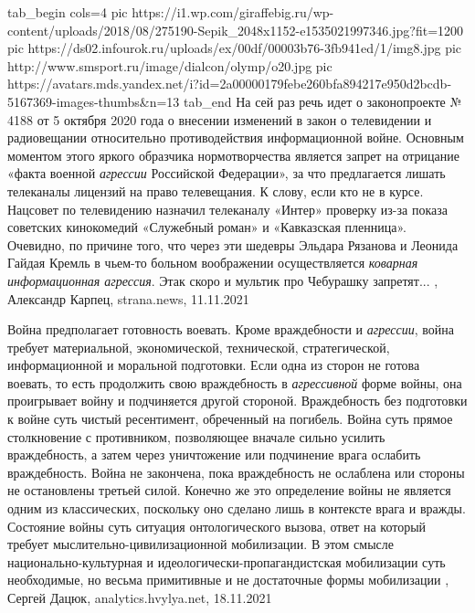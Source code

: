 \ifcmt
  tab_begin cols=4
		 pic https://i1.wp.com/giraffebig.ru/wp-content/uploads/2018/08/275190-Sepik_2048x1152-e1535021997346.jpg?fit=1200%
		 pic https://ds02.infourok.ru/uploads/ex/00df/00003b76-3fb941ed/1/img8.jpg
     pic http://www.smsport.ru/image/dialcon/olymp/o20.jpg
     pic https://avatars.mds.yandex.net/i?id=2a00000179febe260bfa894217e950d2bcdb-5167369-images-thumbs&n=13
  tab_end
\fi
На сей раз речь идет о законопроекте № 4188 от 5 октября 2020 года о внесении
изменений в закон о телевидении и радиовещании относительно противодействия
информационной войне. Основным моментом этого яркого образчика нормотворчества
является запрет на отрицание «факта военной \emph{агрессии} Российской
Федерации», за что предлагается лишать телеканалы лицензий на право
телевещания.  К слову, если кто не в курсе. Нацсовет по телевидению назначил
телеканалу «Интер» проверку из-за показа советских кинокомедий «Служебный
роман» и «Кавказская пленница». Очевидно, по причине того, что через эти
шедевры Эльдара Рязанова и Леонида Гайдая Кремль в чьем-то больном воображении
осуществляется \emph{коварная информационная агрессия}. Этак скоро и мультик
про Чебурашку запретят...
, 
Александр Карпец, strana.news, 11.11.2021

Война предполагает готовность воевать. Кроме враждебности и \emph{агрессии},
война требует материальной, экономической, технической, стратегической,
информационной и моральной подготовки. Если одна из сторон не готова воевать,
то есть продолжить свою враждебность в \emph{агрессивной} форме войны, она проигрывает
войну и подчиняется другой стороной.  Враждебность без подготовки к войне суть
чистый ресентимент, обреченный на погибель.  Война суть прямое столкновение с
противником, позволяющее вначале сильно усилить враждебность, а затем через
уничтожение или подчинение врага ослабить враждебность.  Война не закончена,
пока враждебность не ослаблена или стороны не остановлены третьей силой.
Конечно же это определение войны не является одним из классических, поскольку
оно сделано лишь в контексте врага и вражды.  Состояние войны суть ситуация
онтологического вызова, ответ на который требует мыслительно-цивилизационной
мобилизации. В этом смысле национально-культурная и
идеологически-пропагандистская мобилизации суть необходимые, но весьма
примитивные и не достаточные формы мобилизации
, Сергей Дацюк, analytics.hvylya.net, 18.11.2021
